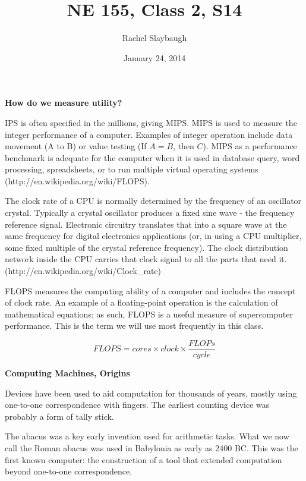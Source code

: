 \documentclass[12pt, ]{article}
\title{NE 155, Class 2, S14}
\author{Rachel Slaybaugh}
\date{January 24, 2014}
\begin{document}
\maketitle

\noindent \textbf{How do we measure utility?}

IPS is often specified in the millions, giving MIPS. MIPS is used to measure the integer performance of a computer. Examples of integer operation include data movement (A to B) or value testing (If $A = B$, then $C$). MIPS as a performance benchmark is adequate for the computer when it is used in database query, word processing, spreadsheets, or to run multiple virtual operating systems (http://en.wikipedia.org/wiki/FLOPS).

The clock rate of a CPU is normally determined by the frequency of an oscillator crystal. Typically a crystal oscillator produces a fixed sine wave - the frequency reference signal. Electronic circuitry translates that into a square wave at the same frequency for digital electronics applications (or, in using a CPU multiplier, some fixed multiple of the crystal reference frequency). The clock distribution network inside the CPU carries that clock signal to all the parts that need it. (http://en.wikipedia.org/wiki/Clock\_rate)

FLOPS measures the computing ability of a computer and includes the concept of clock rate. An example of a floating-point operation is the calculation of mathematical equations; as such, FLOPS is a useful measure of supercomputer performance. This is the term we will use most frequently in this class. 

\begin{equation}
FLOPS = cores \times clock \times \frac{FLOPs}{cycle} \nonumber
\end{equation}

\vspace*{2em}
\noindent \textbf{Computing Machines, Origins}

Devices have been used to aid computation for thousands of years, mostly using one-to-one correspondence with fingers. The earliest counting device was probably a form of tally stick. 

The abacus was a key early invention used for arithmetic tasks. What we now call the Roman abacus was used in Babylonia as early as 2400 BC. This was the first known computer: the construction of a tool that extended computation beyond one-to-one correspondence. 
\end{document}
